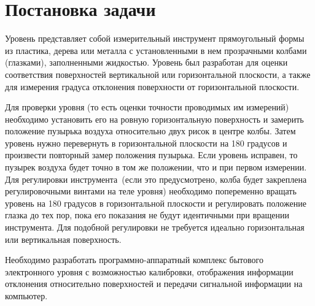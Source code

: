 \documentclass[document.tex]{subfiles}
\begin{document}
\section{Постановка задачи}
Уровень представляет собой измерительный инструмент прямоугольный формы из
пла\-стика, дерева или металла с установленными в нем прозрачными колбами
(глазками), запол\-ненными жидкостью. Уровень был разработан для оценки
соответствия поверхностей верти\-кальной или горизонтальной плоскости, а также
для измерения градуса отклонения поверх\-ности от горизонтальной плоскости.

Для проверки уровня (то есть оценки точности проводимых им измерений) необходимо
установить его на ровную горизонтальную поверхность и замерить положение
пузырька воздуха относительно двух рисок в центре колбы. Затем уровень нужно
перевернуть в горизонтальной плоскости на 180 градусов и произвести повторный
замер положения пузырь\-ка. Если уровень исправен, то пузырек воздуха будет точно
в том же положении, что и при первом измерении. Для регулировки
инструмента~(если это предусмотрено, колба будет закреплена регулировочными
винтами на теле уровня) необходимо попеременно вращать уровень на 180 градусов в
горизонтальной плоскости и регулировать положение глазка до тех пор, пока его
показания не будут идентичными при вращении инструмента. Для подобной
регулировки не требуется идеально горизонтальная или вертикальная
поверхность.\cite{spiritlevel_info}

Необходимо разработать программно-аппаратный комплекс бытового электронного
уров\-ня с возможностью калибровки, отображения информации отклонения относительно
поверх\-ностей и передачи сигнальной информации на компьютер.
\end{document}

